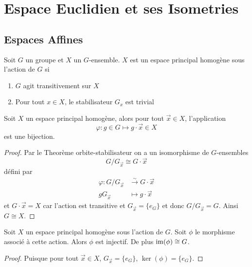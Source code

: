 \section{Espace Euclidien et ses Isometries}

\subsection{Espaces Affines}

\begin{definition}
	Soit $G$ un groupe et $X$ un $G$-ensemble. $X$ est un espace principal
	homogène sous l'action de $G$ si
	\begin{enumerate}
		\item $G$ agit transitivement sur $X$
		\item Pour tout $x \in X$, le stabilisateur $G_x$ est trivial
	\end{enumerate}
\end{definition}

\begin{proposition}
	\label{prop:sous-espace-orbite}
	Soit $X$ un espace principal homogène, alors pour tout $\vec{x} \in X$,
	l'application
	\begin{equation*}
		\varphi : g \in G \mapsto g\cdot\vec{x} \in X
	\end{equation*}
	est une bijection.
\end{proposition}

\begin{proof}
	Par le Theorème orbite-stabilisateur on a un isomorphisme de $G$-ensembles
	\begin{equation*}
		G/G_\vec{x} \cong G\cdot\vec{x}
	\end{equation*}
	défini par
	\begin{align*}
		\varphi : G/G_\vec{x} &\xrightarrow{\sim}  G\cdot\vec{x}\\
		gG_\vec{x} &\mapsto g \cdot \vec{x}
	\end{align*}
	et $G\cdot\vec{x} = X$ car l'action est transitive et $G_\vec{x} = \{e_G\}$
	et donc $G/G_\vec{x} = G$. Ainsi $G \cong X$.
\end{proof}

\begin{proposition}
	Soit $X$ un espace principal homogène sous l'action de $G$. Soit $\phi$ le
	morphisme associé à cette action. Alors $\phi$ est injectif.
	De plus $\operatorname{im}(\phi) \cong G$.
\end{proposition}

\begin{proof}
	Puisque pour tout $\vec{x} \in X$, $G_\vec{x} = \{e_G\}$, $\ker(\phi) =
	\{e_G\}$.
\end{proof}

